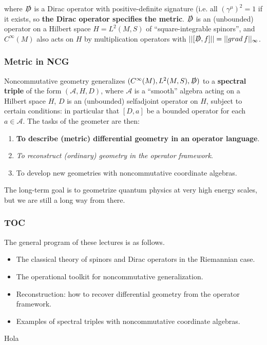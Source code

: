 \documentclass{article}
\begin{document}
where $\slashed D$ is a Dirac operator with positive-definite signature (i.e. all $( \gamma^\mu)^2 = 1$ if it exists, so \textbf{the Dirac operator specifies the metric}. $\slashed D$ is an (unbounded) operator on a Hilbert space $H = L^2(M, S)$ of “square-integrable spinors”, and $C^\infty(M)$ also acts on $H$ by multiplication
operators with $||[\slashed D, f ]|| = ||grad\,f||_\infty$.

\subsubsection*{Metric in NCG}

Noncommutative geometry generalizes $(C^\infty (M), L^2(M, S), \slashed D)$ to a \textbf{spectral triple} of the form $(\mathcal A, H, D)$, where $\mathcal A$ is a “smooth” algebra acting on a Hilbert space $H$, $D$ is an (unbounded) selfadjoint operator on $H$, subject to certain conditions: in particular that $[D, a]$ be a bounded operator for each $a \in \mathcal A$. The tasks of the geometer are then:

\begin{enumerate}
    \item \textbf{To describe (metric) differential geometry in an operator language}.
    \item \textit{To reconstruct (ordinary) geometry in the operator framework}.
    \item To develop new geometries with noncommutative coordinate algebras.
\end{enumerate}

The long-term goal is to geometrize quantum physics at very high energy scales, but we
are still a long way from there.

\subsubsection*{TOC}

The general program of these lectures is as follows.

\begin{itemize}
    \item The classical theory of spinors and Dirac operators in the Riemannian case.
    \item The operational toolkit for noncommutative generalization.
    \item Reconstruction: how to recover differential geometry from the operator framework.
    \item Examples of spectral triples with noncommutative coordinate algebras.
\end{itemize}

Hola
\end{document}
